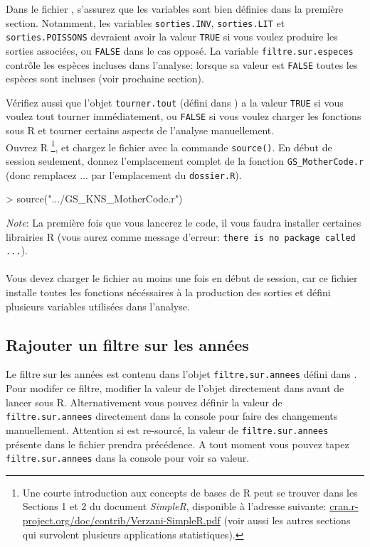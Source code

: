 \documentclass{article}
\begin{document}
   Dans le fichier \mcode, s'assurez que les variables sont bien définies dans
   la première section. Notamment, les variables
   \texttt{sorties.INV}, \texttt{sorties.LIT} et
   \texttt{sorties.POISSONS} devraient avoir la valeur \texttt{TRUE} si vous
   voulez produire les sorties associées, ou \texttt{FALSE} dans le
   cas opposé. La variable \texttt{filtre.sur.especes} contrôle les
   espèces incluses dans l'analyse: lorsque sa valeur est
   \texttt{FALSE} toutes les espèces sont incluses (voir prochaine
   section).

  Vérifiez aussi que l'objet \texttt{tourner.tout} (défini dans \mcode) a la valeur \texttt{TRUE} si vous voulez
tout tourner immédiatement, ou \texttt{FALSE} si vous voulez
charger les fonctions sous R et tourner certains
aspects de l'analyse manuellement.
\\
Ouvrez R \footnote{Une courte introduction aux concepts de bases de R peut
  se trouver dans les Sections 1 et 2 du document \emph{SimpleR}, disponible
  à l'adresse suivante:
  \url{cran.r-project.org/doc/contrib/Verzani-SimpleR.pdf} (voir aussi
  les autres sections qui survolent plusieurs applications
  statistiques).}, et chargez le fichier \mcode {} avec la commande
\texttt{source()}.
  En début de session seulement, donnez
  l'emplacement complet de la fonction \texttt{GS\_MotherCode.r} (donc
  remplacez ... par l'emplacement du \texttt{dossier.R}).


\begin{Schunk}
\begin{Sinput}
> source(".../GS_KNS_MotherCode.r")
\end{Sinput}
\end{Schunk}

\emph{Note}: La première fois que vous lancerez le code, il vous
faudra installer certaines librairies R (vous aurez comme message d'erreur:
\texttt{there is no package called ...}). \\
\\

 Vous devez charger le fichier \mcode {} au moins
une fois en début de session, car ce fichier installe toutes les fonctions nécéssaires à la production des
sorties et défini plusieurs
variables utilisées dans l'analyse.

\subsection{Rajouter un filtre sur les années}
\label{filtre::an}
Le filtre sur les années est contenu dans l'objet
\texttt{filtre.sur.annees} défini dans \mcode. Pour modifer ce filtre,
modifier la valeur de l'objet directement dans \mcode avant de lancer
\mcode sous R. Alternativement vous pouvez définir la valeur de
\texttt{filtre.sur.annees} directement dans la console pour faire des
changements manuellement. Attention si \mcode est re-sourcé, la
valeur de \texttt{filtre.sur.annees} présente dans le fichier prendra
précédence. A tout moment vous pouvez tapez
\texttt{filtre.sur.annees} dans la console pour voir sa valeur.
\end{document}
